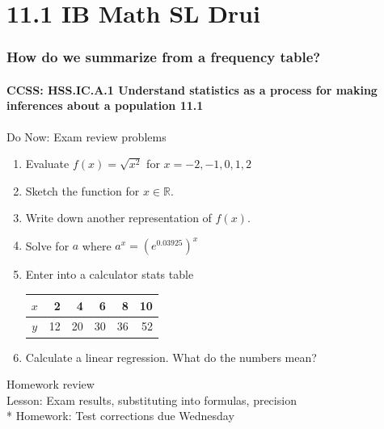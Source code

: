 \documentclass{beamer}
\begin{document}
  \section{11.1 IB Math SL Drui}
  \frame
  {
    \frametitle{How do we summarize from a frequency table?}
    \framesubtitle{CCSS: HSS.IC.A.1 Understand statistics as a process for making inferences about a population \qquad \alert{11.1}}

  \begin{block}{Do Now: Exam review problems}
    \begin{enumerate}
      \item Evaluate $f(x)=\sqrt{x^2}$ for $x=-2, -1, 0, 1, 2$
      \item Sketch the function for $x \in \mathbb{R}$.
      \item Write down another representation of $f(x)$.
      \item Solve for $a$ where $a^x=(e^{0.03925})^x$
      \item Enter into a calculator stats table\\
          \begin{tabular}{|c|r|r|r|r|r|}
          \hline
          $x$ & 2 & 4 & 6 & 8 & 10\\
          \hline
          $y$ & 12 & 20 & 30 & 36 & 52 \\
          \hline
          \end{tabular}
          \item Calculate a linear regression. What do the numbers mean?
      \end{enumerate}
    \end{block}
    Homework review\\
    Lesson: Exam results, substituting into formulas, precision\\*
    Homework: Test corrections due Wednesday\\
  }
\end{document}
